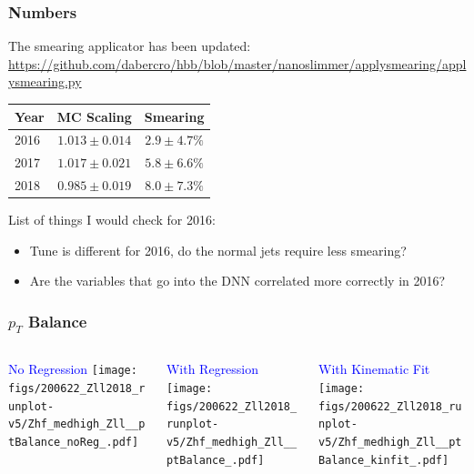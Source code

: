 \documentclass{beamer}
\begin{document}
\begin{frame}
  \frametitle{Numbers}

  The smearing applicator has been updated: \url{https://github.com/dabercro/hbb/blob/master/nanoslimmer/applysmearing/applysmearing.py}

  \vfill
  \begin{center}
    \begin{tabular}{|l|c|c|}
      \hline
      Year & MC Scaling & Smearing \\
      \hline
      2016 & $1.013 \pm 0.014$ & $2.9 \pm 4.7 \%$ \\
      2017 & $1.017 \pm 0.021$ & $5.8 \pm 6.6 \%$ \\
      2018 & $0.985 \pm 0.019$ & $8.0 \pm 7.3 \%$ \\
      \hline
    \end{tabular}
  \end{center}

  \vfill
  List of things I would check for 2016:
  \begin{itemize}
  \item Tune is different for 2016, do the normal jets require less smearing?
  \item Are the variables that go into the DNN correlated more correctly in 2016?
  \end{itemize}

\end{frame}

\begin{frame}
  \frametitle{$p_T$ Balance}

  \begin{columns}
    \begin{column}{0.33\linewidth}
      \centering
      \textcolor{blue}{No Regression}
      \texttt{[image: figs/200622\_Zll2018\_runplot-v5/Zhf\_medhigh\_Zll\_\_ptBalance\_noReg\_.pdf]}
    \end{column}
    \begin{column}{0.34\linewidth}
      \centering
      \textcolor{blue}{With Regression}
      \texttt{[image: figs/200622\_Zll2018\_runplot-v5/Zhf\_medhigh\_Zll\_\_ptBalance\_.pdf]}
    \end{column}
    \begin{column}{0.33\linewidth}
      \centering
      \textcolor{blue}{With Kinematic Fit}
      \texttt{[image: figs/200622\_Zll2018\_runplot-v5/Zhf\_medhigh\_Zll\_\_ptBalance\_kinfit\_.pdf]}
    \end{column}
  \end{columns}

\end{frame}
\end{document}
